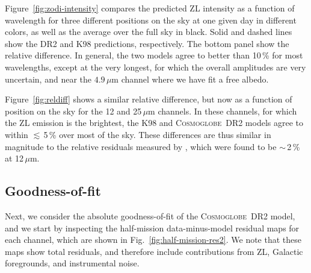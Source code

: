 \documentclass[twocolumn]{aa}
\newcommand{\cosmoglobe}{\textsc{Cosmoglobe}}
\begin{document}
Figure~\ref{fig:zodi-intensity} compares the predicted ZL intensity
as a function of wavelength for three different positions on the sky
at one given day in different colors, as well as the average over the
full sky in black. Solid and dashed lines show the DR2 and K98
predictions, respectively. The bottom panel show the relative
difference. In general, the two models agree to better than 10\,\% for
most wavelengths, except at the very longest, for which the overall
amplitudes are very uncertain, and near the $4.9\,\mu$m channel where we 
have fit a free albedo. 

Figure~\ref{fig:reldiff} shows a similar relative difference, but now
as a function of position on the sky for the 12 and 25\,$\mu$m
channels. In these channels, for which the ZL emission is the
brightest, the K98 and \cosmoglobe\ DR2 models agree to within
$\lesssim$\,5\,\% over most of the sky. These differences are thus
similar in magnitude to the relative residuals measured by
\citet{Kelsall1998}, which were found to be $\sim$\,2\,\% at
12\,$\mu$m.

\subsection{Goodness-of-fit}

Next, we consider the absolute goodness-of-fit of the \cosmoglobe\ DR2
model, and we start by inspecting the half-mission data-minus-model
residual maps for each channel, which are shown in
Fig.~\ref{fig:half-mission-res2}. We note that these maps show total
residuals, and therefore include contributions from ZL, Galactic
foregrounds, and instrumental noise.
\end{document}
